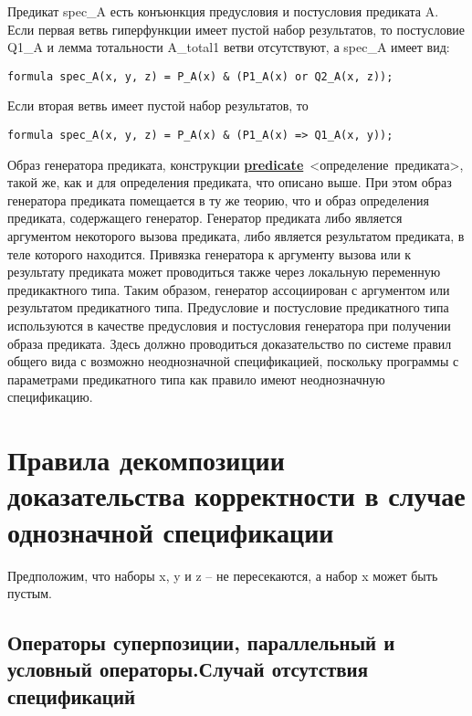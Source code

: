 \documentclass[10pt,a4paper]{article}
\begin{document}
Предикат spec\_A есть конъюнкция предусловия и постусловия предиката A. Если первая ветвь гиперфункции имеет пустой набор результатов, то постусловие Q1\_A и лемма тотальности A\_total1 ветви отсутствуют, а spec\_A имеет вид:

\begin{center}
\begin{lstlisting}
formula spec_A(x, y, z) = P_A(x) & (P1_A(x) or Q2_A(x, z));
\end{lstlisting}
\end{center}

Если вторая ветвь имеет пустой набор результатов, то

\begin{center}
\begin{lstlisting}
formula spec_A(x, y, z) = P_A(x) & (P1_A(x) => Q1_A(x, y));
\end{lstlisting}
\end{center}

Образ генератора предиката, конструкции \underline{\textbf{predicate}} <определение предиката>, такой же, как и для определения предиката, что описано выше. При этом образ генератора предиката помещается в ту же теорию, что и образ определения предиката, содержащего генератор. Генератор предиката либо является аргументом некоторого вызова предиката, либо является результатом предиката, в теле которого находится. Привязка генератора к аргументу вызова или к результату предиката может проводиться также через локальную переменную предикактного типа. Таким образом, генератор ассоциирован с аргументом или результатом предикатного типа. Предусловие и постусловие предикатного типа используются в качестве предусловия и постусловия генератора при получении образа предиката. Здесь должно проводиться доказательство по системе правил общего вида с возможно неоднозначной спецификацией, поскольку программы с параметрами предикатного типа как правило имеют неоднозначную спецификацию.

\section{Правила декомпозиции доказательства корректности в случае однозначной спецификации}

Предположим, что наборы x, y и z – не пересекаются, а набор x может быть пустым.

\subsection{Операторы суперпозиции, параллельный и условный операторы.Случай отсутствия спецификаций}
\label{ex:specnotex}
\end{document}
